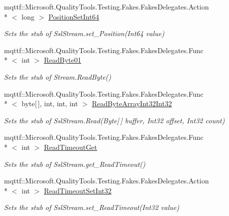\begin{DoxyCompactItemize}
mqttf\-::\-Microsoft.\-Quality\-Tools.\-Testing.\-Fakes.\-Fakes\-Delegates.\-Action\\*
$<$ long $>$ \hyperlink{class_system_1_1_net_1_1_security_1_1_fakes_1_1_stub_ssl_stream_a83a0d801677c029ecb6f7497ae4457b4}{Position\-Set\-Int64}
\begin{DoxyCompactList}\small\item\em Sets the stub of Ssl\-Stream.\-set\-\_\-\-Position(\-Int64 value)\end{DoxyCompactList}\item 
mqttf\-::\-Microsoft.\-Quality\-Tools.\-Testing.\-Fakes.\-Fakes\-Delegates.\-Func\\*
$<$ int $>$ \hyperlink{class_system_1_1_net_1_1_security_1_1_fakes_1_1_stub_ssl_stream_a19907872265fe2e7c559790cbbf324a8}{Read\-Byte01}
\begin{DoxyCompactList}\small\item\em Sets the stub of Stream.\-Read\-Byte()\end{DoxyCompactList}\item 
mqttf\-::\-Microsoft.\-Quality\-Tools.\-Testing.\-Fakes.\-Fakes\-Delegates.\-Func\\*
$<$ byte\mbox{[}$\,$\mbox{]}, int, int, int $>$ \hyperlink{class_system_1_1_net_1_1_security_1_1_fakes_1_1_stub_ssl_stream_a0e3322ed65f33b6d7f376d6ba4f39042}{Read\-Byte\-Array\-Int32\-Int32}
\begin{DoxyCompactList}\small\item\em Sets the stub of Ssl\-Stream.\-Read(\-Byte\mbox{[}$\,$\mbox{]} buffer, Int32 offset, Int32 count)\end{DoxyCompactList}\item 
mqttf\-::\-Microsoft.\-Quality\-Tools.\-Testing.\-Fakes.\-Fakes\-Delegates.\-Func\\*
$<$ int $>$ \hyperlink{class_system_1_1_net_1_1_security_1_1_fakes_1_1_stub_ssl_stream_a2a63432a8ceea5f3c4e4867260adf80f}{Read\-Timeout\-Get}
\begin{DoxyCompactList}\small\item\em Sets the stub of Ssl\-Stream.\-get\-\_\-\-Read\-Timeout()\end{DoxyCompactList}\item 
mqttf\-::\-Microsoft.\-Quality\-Tools.\-Testing.\-Fakes.\-Fakes\-Delegates.\-Action\\*
$<$ int $>$ \hyperlink{class_system_1_1_net_1_1_security_1_1_fakes_1_1_stub_ssl_stream_ab62a708cfb837b4978fbc81ba22be732}{Read\-Timeout\-Set\-Int32}
\begin{DoxyCompactList}\small\item\em Sets the stub of Ssl\-Stream.\-set\-\_\-\-Read\-Timeout(\-Int32 value)\end{DoxyCompactList}\item 

\end{DoxyCompactItemize}
